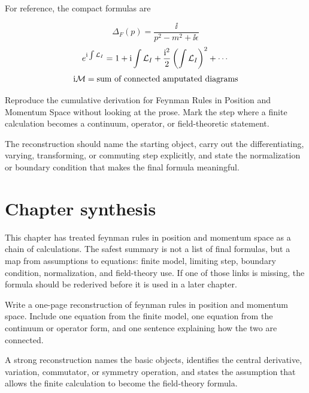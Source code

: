 For reference, the compact formulas are

\[
  \Delta_F(p)=\frac{\ii}{p^2-m^2+\ii\epsilon}
\]
\[
  e^{\mathrm i\int\mathcal L_I}=1+\mathrm i\int\mathcal L_I+\frac{\mathrm i^2}{2}\left(\int\mathcal L_I\right)^2+\cdots
\]
\[
  \mathrm i\mathcal M=\hbox{sum of connected amputated diagrams}
\]

\begin{exercise}
Reproduce the cumulative derivation for Feynman Rules in Position and Momentum Space without looking at the prose.  Mark the step where a finite calculation becomes a continuum, operator, or field-theoretic statement.
\begin{answer}
The reconstruction should name the starting object, carry out the differentiating, varying, transforming, or commuting step explicitly, and state the normalization or boundary condition that makes the final formula meaningful.
\end{answer}
\end{exercise}



\section{Chapter synthesis}

This chapter has treated feynman rules in position and momentum space as a chain of calculations.  The safest summary is not a list of final formulas, but a map from assumptions to equations: finite model, limiting step, boundary condition, normalization, and field-theory use.  If one of those links is missing, the formula should be rederived before it is used in a later chapter.

\begin{exercise}
Write a one-page reconstruction of feynman rules in position and momentum space.  Include one equation from the finite model, one equation from the continuum or operator form, and one sentence explaining how the two are connected.
\begin{answer}
A strong reconstruction names the basic objects, identifies the central derivative, variation, commutator, or symmetry operation, and states the assumption that allows the finite calculation to become the field-theory formula.
\end{answer}
\end{exercise}
